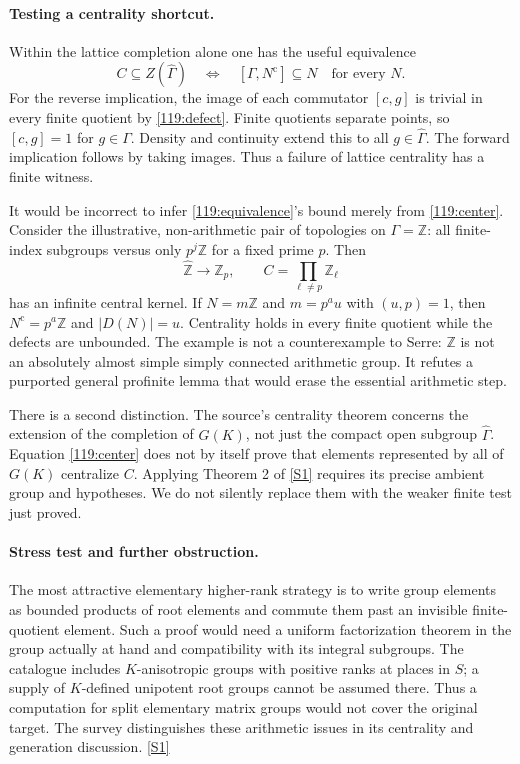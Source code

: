 \documentclass[11pt,a4paper]{article}
\newcommand{\Z}{\mathbb{Z}}
\newcommand{\sref}[2]{\hyperlink{source:#1:#2}{[S#2]}}
\numberwithin{equation}{section}
\begin{document}
\paragraph{Testing a centrality shortcut.}
Within the lattice completion alone one has the useful equivalence
\begin{equation}\label{119:center}
 C\subseteq Z(\widehat\Gamma)
 \quad\Longleftrightarrow\quad
 [\Gamma,N^{\mathrm c}]\subseteq N\quad\text{for every }N.
\end{equation}
For the reverse implication, the image of each commutator $[c,g]$ is
trivial in every finite quotient by \eqref{119:defect}.  Finite quotients
separate points, so $[c,g]=1$ for $g\in\Gamma$.  Density and continuity
extend this to all $g\in\widehat\Gamma$.  The forward implication follows
by taking images.  Thus a failure of lattice centrality has a finite
witness.

It would be incorrect to infer \eqref{119:equivalence}'s bound merely
from \eqref{119:center}.  Consider the illustrative, non-arithmetic
pair of topologies on $\Gamma=\Z$: all finite-index subgroups versus only
$p^j\Z$ for a fixed prime $p$.  Then
\[
 \widehat{\Z}\longrightarrow\Z_p,
 \qquad C=\prod_{\ell\ne p}\Z_\ell
\]
has an infinite central kernel.  If $N=m\Z$ and
$m=p^a u$ with $(u,p)=1$, then $N^{\mathrm c}=p^a\Z$ and
$|D(N)|=u$.  Centrality holds in every finite quotient while the defects
are unbounded.  The example is not a counterexample to Serre: $\Z$ is
not an absolutely almost simple simply connected arithmetic group.
It refutes a purported general profinite lemma that would erase the
essential arithmetic step.

There is a second distinction.  The source's centrality theorem concerns
the extension of the completion of $G(K)$, not just the compact open
subgroup $\widehat\Gamma$.  Equation \eqref{119:center} does not by itself
prove that elements represented by all of $G(K)$ centralize $C$.
Applying Theorem 2 of \sref{119}{1} requires its precise ambient group
and hypotheses.  We do not silently replace them with the weaker
finite test just proved.

\paragraph{Stress test and further obstruction.}
The most attractive elementary higher-rank strategy is to write group
elements as bounded products of root elements and commute them past an
invisible finite-quotient element.  Such a proof would need a uniform
factorization theorem in the group actually at hand and compatibility
with its integral subgroups.  The catalogue includes $K$-anisotropic
groups with positive ranks at places in $S$; a supply of $K$-defined
unipotent root groups cannot be assumed there.  Thus a computation for
split elementary matrix groups would not cover the original target.
The survey distinguishes these arithmetic issues in its centrality
and generation discussion. \sref{119}{1}
\end{document}
